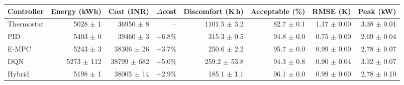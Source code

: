 \begin{tabular}{lrrrrrrr}
\hline
Controller & Energy (kWh) & Cost (INR) & $\Delta$cost & Discomfort (K\,h) & Acceptable (\%) & RMSE (K) & Peak (kW)\\
\hline
Thermostat & 5028 $\pm$ 1 & 36950 $\pm$ 8 & -- & 1101.5 $\pm$ 3.2 & 82.7 $\pm$ 0.1 & 1.17 $\pm$ 0.00 & 3.38 $\pm$ 0.01\\
PID & 5403 $\pm$ 0 & 39460 $\pm$ 3 & +6.8\% & 315.3 $\pm$ 0.5 & 94.8 $\pm$ 0.0 & 0.75 $\pm$ 0.00 & 2.69 $\pm$ 0.04\\
E-MPC & 5243 $\pm$ 3 & 38306 $\pm$ 26 & +3.7\% & 250.6 $\pm$ 2.2 & 95.7 $\pm$ 0.0 & 0.99 $\pm$ 0.00 & 2.78 $\pm$ 0.07\\
DQN & 5273 $\pm$ 112 & 38799 $\pm$ 682 & +5.0\% & 259.2 $\pm$ 53.8 & 94.3 $\pm$ 0.8 & 0.90 $\pm$ 0.04 & 3.32 $\pm$ 0.07\\
Hybrid & 5198 $\pm$ 1 & 38005 $\pm$ 14 & +2.9\% & 185.1 $\pm$ 1.1 & 96.1 $\pm$ 0.0 & 0.99 $\pm$ 0.00 & 2.78 $\pm$ 0.10\\
\hline
\end{tabular}
